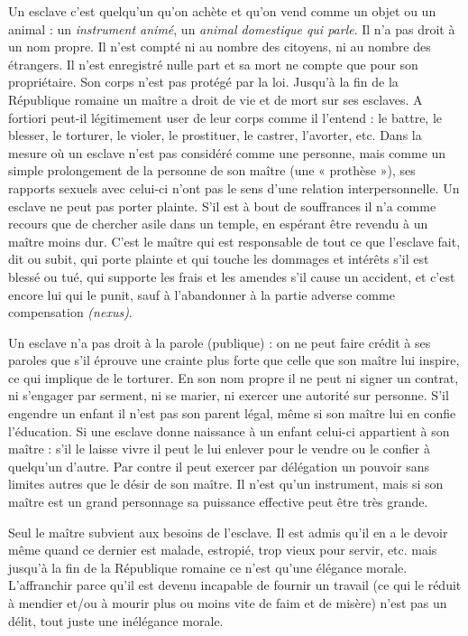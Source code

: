 \label{chap-cites-esclavagistes}

Un esclave c'est quelqu'un qu'on achète et qu'on vend comme un
objet ou un animal : un {\emph{instrument animé}}, un {\emph{animal
domestique qui parle}}. Il n'a pas droit à un nom propre. Il n'est compté ni au nombre des citoyens,
ni au nombre des étrangers. Il n'est enregistré nulle part et sa
mort ne compte que pour son propriétaire. Son corps n'est pas protégé
par la loi. Jusqu'à la fin de la République romaine un maître a droit de vie
et de mort sur ses esclaves. A fortiori peut-il légitimement user de leur
corps comme il l'entend : le battre, le blesser, le torturer, le violer, le
prostituer, le castrer, l'avorter, etc. Dans la mesure où un esclave n'est
pas considéré comme une personne, mais comme un simple prolongement
de la personne de son maître (une « prothèse »), ses rapports
sexuels avec celui-ci n'ont pas le sens d'une relation interpersonnelle.
Un esclave ne peut pas porter plainte. S'il est à bout de souffrances
il n'a comme recours que de chercher asile dans un temple, en espérant
être revendu à un maître moins dur. C'est le maître qui est responsable
de tout ce que l'esclave fait, dit ou subit, qui porte plainte et qui
touche les dommages et intérêts s'il est blessé ou tué, qui supporte les
frais et les amendes s'il cause un accident, et c'est encore lui qui le punit,
sauf à l'abandonner à la partie adverse comme compensation \emph{(nexus)}.

Un esclave n'a pas droit à la parole (publique) : on ne peut faire
crédit à ses paroles que s'il éprouve une crainte plus forte que celle que
son maître lui inspire, ce qui implique de le torturer. En son nom propre
il ne peut ni signer un contrat, ni s'engager par serment, ni se marier, ni
exercer une autorité sur personne. S'il engendre un enfant il n'est pas son
parent légal, même si son maître lui en confie l'éducation. Si une esclave
donne naissance à un enfant celui-ci appartient à son maître : s'il le laisse
vivre il peut le lui enlever pour le vendre ou le confier à quelqu'un d'autre.
Par contre il peut exercer par délégation un pouvoir sans limites autres
que le désir de son maître. Il n'est qu'un instrument, mais si son maître
est un grand personnage sa puissance effective peut être très grande.

Seul le maître subvient aux besoins de l'esclave. Il est admis qu'il
en a le devoir même quand ce dernier est malade, estropié, trop vieux
pour servir, etc. mais jusqu'à la fin de la République romaine ce n'est
qu'une élégance morale. L'affranchir parce qu'il est devenu incapable de
fournir un travail (ce qui le réduit à mendier et/ou à mourir plus ou
moins vite de faim et de misère) n'est pas un délit, tout juste une inélégance
morale.

